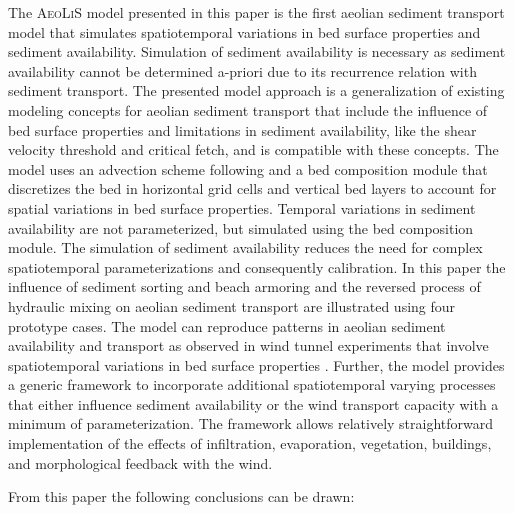 The \textsc{AeoLiS} model presented in this paper is the first aeolian
sediment transport model that simulates spatiotemporal variations in
bed surface properties and sediment availability. Simulation of
sediment availability is necessary as sediment availability cannot be
determined a-priori due to its recurrence relation with sediment
transport. The presented model approach is a generalization of
existing modeling concepts for aeolian sediment transport that include
the influence of bed surface properties and limitations in sediment
availability, like the shear velocity threshold and critical fetch,
and is compatible with these concepts. The model uses an advection
scheme following \citet{deVries2014a} and a bed composition module
that discretizes the bed in horizontal grid cells and vertical bed
layers to account for spatial variations in bed surface
properties. Temporal variations in sediment availability are not
parameterized, but simulated using the bed composition module. The
simulation of sediment availability reduces the need for complex
spatiotemporal parameterizations and consequently calibration. In this
paper the influence of sediment sorting and beach armoring and the
reversed process of hydraulic mixing on aeolian sediment transport are
illustrated using four prototype cases. The model can reproduce
patterns in aeolian sediment availability and transport as observed in
wind tunnel experiments that involve spatiotemporal variations in bed
surface properties \citep{Nickling1995, Dong2004b}. Further, the model
provides a generic framework to incorporate additional spatiotemporal
varying processes that either influence sediment availability or the
wind transport capacity with a minimum of parameterization. The
framework allows relatively straightforward implementation of the
effects of infiltration, evaporation, vegetation, buildings, and
morphological feedback with the wind.

\vspace{.5cm}

\noindent From this paper the following conclusions can be drawn:

